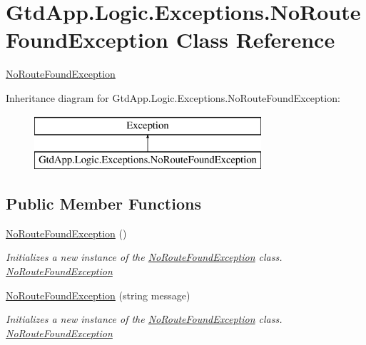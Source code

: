 \hypertarget{class_gtd_app_1_1_logic_1_1_exceptions_1_1_no_route_found_exception}{}\section{Gtd\+App.\+Logic.\+Exceptions.\+No\+Route\+Found\+Exception Class Reference}
\label{class_gtd_app_1_1_logic_1_1_exceptions_1_1_no_route_found_exception}


\mbox{\hyperlink{class_gtd_app_1_1_logic_1_1_exceptions_1_1_no_route_found_exception}{No\+Route\+Found\+Exception}}  


Inheritance diagram for Gtd\+App.\+Logic.\+Exceptions.\+No\+Route\+Found\+Exception\+:\begin{figure}[H]
\begin{center}
\leavevmode
\includegraphics[height=2.000000cm]{class_gtd_app_1_1_logic_1_1_exceptions_1_1_no_route_found_exception}
\end{center}
\end{figure}
\subsection*{Public Member Functions}
\begin{DoxyCompactItemize}
\item 
\mbox{\hyperlink{class_gtd_app_1_1_logic_1_1_exceptions_1_1_no_route_found_exception_a36f6db1bb16919a062cfda6df524f4ff}{No\+Route\+Found\+Exception}} ()
\begin{DoxyCompactList}\small\item\em Initializes a new instance of the \mbox{\hyperlink{class_gtd_app_1_1_logic_1_1_exceptions_1_1_no_route_found_exception}{No\+Route\+Found\+Exception}} class. \mbox{\hyperlink{class_gtd_app_1_1_logic_1_1_exceptions_1_1_no_route_found_exception}{No\+Route\+Found\+Exception}} \end{DoxyCompactList}\item 
\mbox{\hyperlink{class_gtd_app_1_1_logic_1_1_exceptions_1_1_no_route_found_exception_a7baf06c653b7bf0550919f75d61b38bd}{No\+Route\+Found\+Exception}} (string message)
\begin{DoxyCompactList}\small\item\em Initializes a new instance of the \mbox{\hyperlink{class_gtd_app_1_1_logic_1_1_exceptions_1_1_no_route_found_exception}{No\+Route\+Found\+Exception}} class. \mbox{\hyperlink{class_gtd_app_1_1_logic_1_1_exceptions_1_1_no_route_found_exception}{No\+Route\+Found\+Exception}} \end{DoxyCompactList}\end{DoxyCompactItemize}


